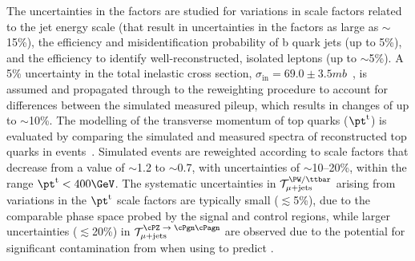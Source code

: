 {
The uncertainties in the \tf factors are studied for variations in
scale factors related to the jet energy scale (that result in
uncertainties in the \tf factors as large as $\sim$15\%), the
efficiency and misidentification probability of b quark jets (up to
5\%), and the efficiency to identify well-reconstructed, isolated
leptons (up to $\sim$5\%). A 5\% uncertainty in the total inelastic
cross section, $\sigma_\text{in} = 69.0 \pm
3.5\unit{mb}$~\cite{Aaboud:2016mmw}, is assumed and propagated through
to the reweighting procedure to account for differences between the
simulated measured pileup, which results in changes of up to
$\sim$10\%. The modelling of the transverse momentum of top quarks
($\pt^\text{t}$) is evaluated by comparing the simulated and measured
\pt spectra of reconstructed top quarks in \ttbar
events~\cite{Khachatryan:2015oqa}.  Simulated events are reweighted
according to scale factors that decrease from a value of $\sim$1.2 to
$\sim$0.7, with uncertainties of $\sim$10--20\%, within the range
$\pt^\text{t} < 400\GeV$.
The systematic uncertainties in $\tf^\text{\PW/\ttbar}_{\mj}$ arising
from variations in the $\pt^\text{t}$ scale factors are typically
small ($\lesssim$5\%), due to the comparable phase space probed by the
signal and control regions, while larger uncertainties
($\lesssim$20\%) in $\tf^{\text{\znunu}}_{\mj}$ are observed due to
the potential for significant contamination from \ttbar when using
\wlj to predict \znunuj.
\par}

